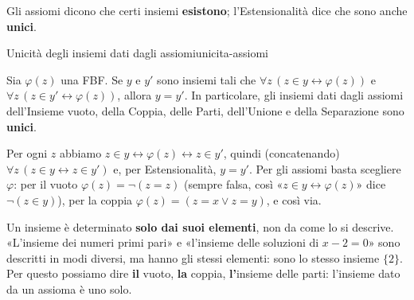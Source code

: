 Gli assiomi dicono che certi insiemi \textbf{esistono}; l'Estensionalità dice che sono anche \textbf{unici}.

\begin{concetto}
\begin{Proposizione}{Unicità degli insiemi dati dagli assiomi}{unicita-assiomi}
    \begin{prerequisiti}
    \end{prerequisiti}
    Sia $\varphi(z)$ una FBF. Se $y$ e $y'$ sono insiemi tali che
    $\forall z\,(z \in y \leftrightarrow \varphi(z))$ e $\forall z\,(z \in y' \leftrightarrow \varphi(z))$, allora $y = y'$.
    In particolare, gli insiemi dati dagli assiomi dell'Insieme vuoto, della Coppia, delle Parti, dell'Unione e
    della Separazione sono \textbf{unici}.
\end{Proposizione}
\begin{dimostrazione}
    Per ogni $z$ abbiamo $z \in y \leftrightarrow \varphi(z) \leftrightarrow z \in y'$, quindi (concatenando)
    $\forall z\,(z \in y \leftrightarrow z \in y')$ e, per Estensionalità, $y = y'$.
    Per gli assiomi basta scegliere $\varphi$: per il vuoto $\varphi(z) = \neg(z = z)$ (sempre falsa, così
    «$z \in y \leftrightarrow \varphi(z)$» dice $\neg(z \in y)$), per la coppia $\varphi(z) = (z = x \vee z = y)$, e così via.
\end{dimostrazione}
\end{concetto}

\begin{spiegazione}
    Un insieme è determinato \textbf{solo dai suoi elementi}, non da come lo si descrive. «L'insieme dei numeri primi pari» e «l'insieme delle soluzioni
    di $x - 2 = 0$» sono descritti in modi diversi, ma hanno gli stessi elementi: sono lo stesso insieme $\{2\}$. Per questo possiamo dire \textbf{il}
    vuoto, \textbf{la} coppia, \textbf{l'}insieme delle parti: l'insieme dato da un assioma è uno solo.
\end{spiegazione}



